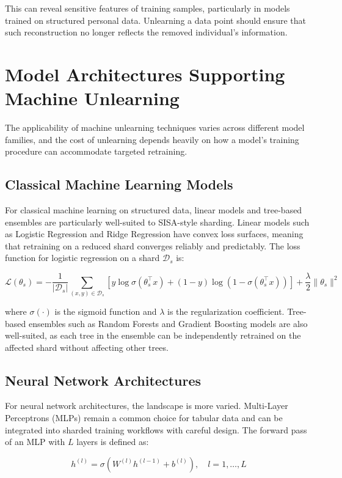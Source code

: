 This can reveal sensitive features of training samples, particularly in models trained on structured personal data. Unlearning a data point should ensure that such reconstruction no longer reflects the removed individual's information.

\section{Model Architectures Supporting Machine Unlearning}

The applicability of machine unlearning techniques varies across different model families, and the cost of unlearning depends heavily on how a model's training procedure can accommodate targeted retraining.

\subsection{Classical Machine Learning Models}
For classical machine learning on structured data, linear models and tree-based ensembles are particularly well-suited to SISA-style sharding. Linear models such as Logistic Regression and Ridge Regression have convex loss surfaces, meaning that retraining on a reduced shard converges reliably and predictably. The loss function for logistic regression on a shard $\mathcal{D}_s$ is:

\[
\mathcal{L}(\theta_s) = -\frac{1}{|\mathcal{D}_s|} \sum_{(x,y) \in \mathcal{D}_s} \left[ y \log \sigma(\theta_s^\top x) + (1-y) \log(1 - \sigma(\theta_s^\top x)) \right] + \frac{\lambda}{2} \|\theta_s\|^2
\]

where $\sigma(\cdot)$ is the sigmoid function and $\lambda$ is the regularization coefficient. Tree-based ensembles such as Random Forests and Gradient Boosting models are also well-suited, as each tree in the ensemble can be independently retrained on the affected shard without affecting other trees.

\subsection{Neural Network Architectures}
For neural network architectures, the landscape is more varied. Multi-Layer Perceptrons (MLPs) remain a common choice for tabular data and can be integrated into sharded training workflows with careful design. The forward pass of an MLP with $L$ layers is defined as:

\[
h^{(l)} = \sigma\left(W^{(l)} h^{(l-1)} + b^{(l)}\right), \quad l = 1, \ldots, L
\]

